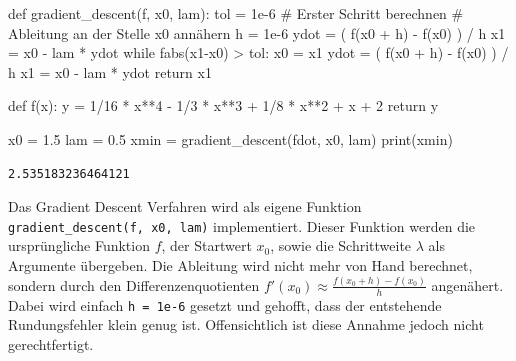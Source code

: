 \documentclass[
  letterpaper,
  DIV=11,
  oneside]{scrreprt}
\newenvironment{Shaded}{\begin{snugshade}}{\end{snugshade}}
\newcommand{\BuiltInTok}[1]{\textcolor[rgb]{0.00,0.23,0.31}{#1}}
\newcommand{\CommentTok}[1]{\textcolor[rgb]{0.37,0.37,0.37}{#1}}
\newcommand{\ControlFlowTok}[1]{\textcolor[rgb]{0.00,0.23,0.31}{#1}}
\newcommand{\DecValTok}[1]{\textcolor[rgb]{0.68,0.00,0.00}{#1}}
\newcommand{\FloatTok}[1]{\textcolor[rgb]{0.68,0.00,0.00}{#1}}
\newcommand{\KeywordTok}[1]{\textcolor[rgb]{0.00,0.23,0.31}{#1}}
\newcommand{\NormalTok}[1]{\textcolor[rgb]{0.00,0.23,0.31}{#1}}
\newcommand{\OperatorTok}[1]{\textcolor[rgb]{0.37,0.37,0.37}{#1}}
\theoremstyle{definition}
\theoremstyle{definition}
\theoremstyle{remark}
\begin{document}
\begin{tcolorbox}
\begin{Shaded}
\begin{Highlighting}[]
\KeywordTok{def}\NormalTok{ gradient\_descent(f, x0, lam):}
\NormalTok{    tol }\OperatorTok{=} \FloatTok{1e{-}6}
    \CommentTok{\# Erster Schritt berechnen}
    \CommentTok{\# Ableitung an der Stelle x0 annähern}
\NormalTok{    h }\OperatorTok{=} \FloatTok{1e{-}6}
\NormalTok{    ydot }\OperatorTok{=}\NormalTok{ ( f(x0 }\OperatorTok{+}\NormalTok{ h) }\OperatorTok{{-}}\NormalTok{ f(x0) ) }\OperatorTok{/}\NormalTok{ h}
\NormalTok{    x1 }\OperatorTok{=}\NormalTok{ x0 }\OperatorTok{{-}}\NormalTok{ lam }\OperatorTok{*}\NormalTok{ ydot}
    \ControlFlowTok{while}\NormalTok{ fabs(x1}\OperatorTok{{-}}\NormalTok{x0) }\OperatorTok{\textgreater{}}\NormalTok{ tol:}
\NormalTok{        x0 }\OperatorTok{=}\NormalTok{ x1}
\NormalTok{        ydot }\OperatorTok{=}\NormalTok{ ( f(x0 }\OperatorTok{+}\NormalTok{ h) }\OperatorTok{{-}}\NormalTok{ f(x0) ) }\OperatorTok{/}\NormalTok{ h}
\NormalTok{        x1 }\OperatorTok{=}\NormalTok{ x0 }\OperatorTok{{-}}\NormalTok{ lam }\OperatorTok{*}\NormalTok{ ydot}
    \ControlFlowTok{return}\NormalTok{ x1}

\KeywordTok{def}\NormalTok{ f(x):}
\NormalTok{    y }\OperatorTok{=} \DecValTok{1}\OperatorTok{/}\DecValTok{16} \OperatorTok{*}\NormalTok{ x}\OperatorTok{**}\DecValTok{4} \OperatorTok{{-}} \DecValTok{1}\OperatorTok{/}\DecValTok{3} \OperatorTok{*}\NormalTok{ x}\OperatorTok{**}\DecValTok{3} \OperatorTok{+} \DecValTok{1}\OperatorTok{/}\DecValTok{8} \OperatorTok{*}\NormalTok{ x}\OperatorTok{**}\DecValTok{2} \OperatorTok{+}\NormalTok{ x }\OperatorTok{+} \DecValTok{2}
    \ControlFlowTok{return}\NormalTok{ y}

\NormalTok{x0 }\OperatorTok{=} \FloatTok{1.5}
\NormalTok{lam }\OperatorTok{=} \FloatTok{0.5}
\NormalTok{xmin }\OperatorTok{=}\NormalTok{ gradient\_descent(fdot, x0, lam)}
\BuiltInTok{print}\NormalTok{(xmin)}
\end{Highlighting}
\end{Shaded}

\begin{verbatim}
2.535183236464121
\end{verbatim}

Das Gradient Descent Verfahren wird als eigene Funktion
\texttt{gradient\_descent(f,\ x0,\ lam)} implementiert. Dieser Funktion
werden die ursprüngliche Funktion \(f\), der Startwert \(x_0\), sowie
die Schrittweite \(\lambda\) als Argumente übergeben. Die Ableitung wird
nicht mehr von Hand berechnet, sondern durch den Differenzenquotienten
\(f'(x_0) \approx \frac{f(x_0 + h) - f(x_0)}{h}\) angenähert. Dabei wird
einfach \texttt{h\ =\ 1e-6} gesetzt und gehofft, dass der entstehende
Rundungsfehler klein genug ist. Offensichtlich ist diese Annahme jedoch
nicht gerechtfertigt.

\end{tcolorbox}
\end{document}

